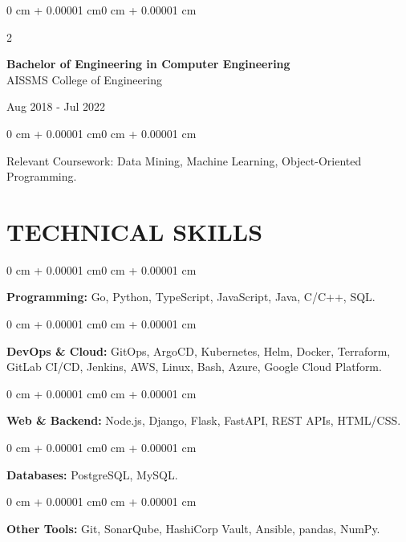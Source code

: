 \documentclass[10pt, letterpaper]{article}
\newenvironment{onecolentry}{
    \begin{adjustwidth}{0 cm + 0.00001 cm}{0 cm + 0.00001 cm}
}{
    \end{adjustwidth}
}
\newenvironment{twocolentry}[2][]{
    \onecolentry
    \def\secondColumn{#2}
    \setcolumnwidth{\fill, 4.5 cm}
    \begin{paracol}{2}
}{
    \switchcolumn \raggedleft \secondColumn
    \end{paracol}
    \endonecolentry
}
\begin{document}
\begin{twocolentry}{
    Aug 2018 - Jul 2022
}
    \textbf{Bachelor of Engineering in Computer Engineering} \\
    AISSMS College of Engineering
\end{twocolentry}
\begin{onecolentry}
Relevant Coursework: Data Mining, Machine Learning, Object-Oriented Programming.
\end{onecolentry}
\section{TECHNICAL SKILLS}
\begin{onecolentry}
\textbf{Programming:} Go, Python, TypeScript, JavaScript, Java, C/C++, SQL.
\end{onecolentry}
\vspace{0.06 cm}
\begin{onecolentry}
\textbf{DevOps \& Cloud:} GitOps, ArgoCD, Kubernetes, Helm, Docker, Terraform, GitLab CI/CD, Jenkins, AWS, Linux, Bash, Azure, Google Cloud Platform.
\end{onecolentry}
\vspace{0.06 cm}
\begin{onecolentry}
\textbf{Web \& Backend:} Node.js, Django, Flask, FastAPI, REST APIs, HTML/CSS.
\end{onecolentry}
\vspace{0.06 cm}
\begin{onecolentry}
\textbf{Databases:} PostgreSQL, MySQL.
\end{onecolentry}
\vspace{0.06 cm}
\begin{onecolentry}
\textbf{Other Tools:} Git, SonarQube, HashiCorp Vault, Ansible, pandas, NumPy.
\end{onecolentry}

\end{document}
